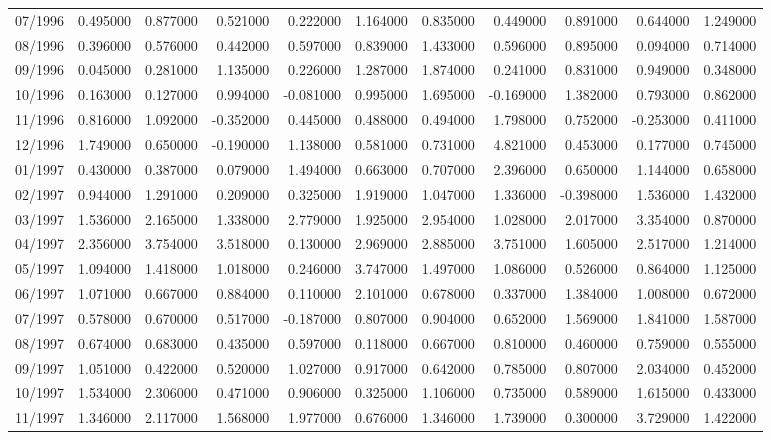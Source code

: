 \begin{tabular}{lrrrrrrrrrr}
07/1996 & 0.495000 & 0.877000 & 0.521000 & 0.222000 & 1.164000 & 0.835000 & 0.449000 & 0.891000 & 0.644000 & 1.249000 \\
08/1996 & 0.396000 & 0.576000 & 0.442000 & 0.597000 & 0.839000 & 1.433000 & 0.596000 & 0.895000 & 0.094000 & 0.714000 \\
09/1996 & 0.045000 & 0.281000 & 1.135000 & 0.226000 & 1.287000 & 1.874000 & 0.241000 & 0.831000 & 0.949000 & 0.348000 \\
10/1996 & 0.163000 & 0.127000 & 0.994000 & -0.081000 & 0.995000 & 1.695000 & -0.169000 & 1.382000 & 0.793000 & 0.862000 \\
11/1996 & 0.816000 & 1.092000 & -0.352000 & 0.445000 & 0.488000 & 0.494000 & 1.798000 & 0.752000 & -0.253000 & 0.411000 \\
12/1996 & 1.749000 & 0.650000 & -0.190000 & 1.138000 & 0.581000 & 0.731000 & 4.821000 & 0.453000 & 0.177000 & 0.745000 \\
01/1997 & 0.430000 & 0.387000 & 0.079000 & 1.494000 & 0.663000 & 0.707000 & 2.396000 & 0.650000 & 1.144000 & 0.658000 \\
02/1997 & 0.944000 & 1.291000 & 0.209000 & 0.325000 & 1.919000 & 1.047000 & 1.336000 & -0.398000 & 1.536000 & 1.432000 \\
03/1997 & 1.536000 & 2.165000 & 1.338000 & 2.779000 & 1.925000 & 2.954000 & 1.028000 & 2.017000 & 3.354000 & 0.870000 \\
04/1997 & 2.356000 & 3.754000 & 3.518000 & 0.130000 & 2.969000 & 2.885000 & 3.751000 & 1.605000 & 2.517000 & 1.214000 \\
05/1997 & 1.094000 & 1.418000 & 1.018000 & 0.246000 & 3.747000 & 1.497000 & 1.086000 & 0.526000 & 0.864000 & 1.125000 \\
06/1997 & 1.071000 & 0.667000 & 0.884000 & 0.110000 & 2.101000 & 0.678000 & 0.337000 & 1.384000 & 1.008000 & 0.672000 \\
07/1997 & 0.578000 & 0.670000 & 0.517000 & -0.187000 & 0.807000 & 0.904000 & 0.652000 & 1.569000 & 1.841000 & 1.587000 \\
08/1997 & 0.674000 & 0.683000 & 0.435000 & 0.597000 & 0.118000 & 0.667000 & 0.810000 & 0.460000 & 0.759000 & 0.555000 \\
09/1997 & 1.051000 & 0.422000 & 0.520000 & 1.027000 & 0.917000 & 0.642000 & 0.785000 & 0.807000 & 2.034000 & 0.452000 \\
10/1997 & 1.534000 & 2.306000 & 0.471000 & 0.906000 & 0.325000 & 1.106000 & 0.735000 & 0.589000 & 1.615000 & 0.433000 \\
11/1997 & 1.346000 & 2.117000 & 1.568000 & 1.977000 & 0.676000 & 1.346000 & 1.739000 & 0.300000 & 3.729000 & 1.422000 \\

\end{tabular}

